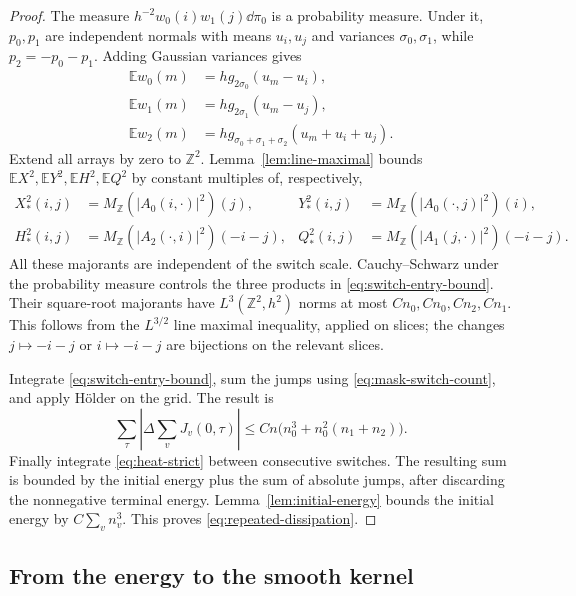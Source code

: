 \begin{proof}
The measure $h^{-2}w_0(i)w_1(j)\dd\pi_0$ is a probability measure.
Under it, $p_0,p_1$ are independent normals with means $u_i,u_j$
and variances $\sigma_0,\sigma_1$, while $p_2=-p_0-p_1$.
Adding Gaussian variances gives
\begin{align*}
 \mathbb E w_0(m)&=h g_{2\sigma_0}(u_m-u_i),\\
 \mathbb E w_1(m)&=h g_{2\sigma_1}(u_m-u_j),\\
 \mathbb E w_2(m)&=h g_{\sigma_0+\sigma_1+\sigma_2}(u_m+u_i+u_j).
\end{align*}
Extend all arrays by zero to $\mathbb Z^2$. Lemma~\ref{lem:line-maximal}
bounds $\mathbb E X^2,\mathbb E Y^2,\mathbb E H^2,\mathbb E Q^2$
by constant multiples of, respectively,
\begin{align*}
 X_*^2(i,j)&=M_{\mathbb Z}(|A_0(i,\cdot)|^2)(j),&
 Y_*^2(i,j)&=M_{\mathbb Z}(|A_0(\cdot,j)|^2)(i),\\
 H_*^2(i,j)&=M_{\mathbb Z}(|A_2(\cdot,i)|^2)(-i-j),&
 Q_*^2(i,j)&=M_{\mathbb Z}(|A_1(j,\cdot)|^2)(-i-j).
\end{align*}
All these majorants are independent of the switch scale.
Cauchy--Schwarz under the probability measure controls the three
products in \eqref{eq:switch-entry-bound}. Their square-root majorants
have $L^3(\mathbb Z^2,h^2)$ norms at most
$Cn_0,Cn_0,Cn_2,Cn_1$. This follows from the $L^{3/2}$ line maximal
inequality, applied on slices; the changes $j\mapsto-i-j$ or
$i\mapsto-i-j$ are bijections on the relevant slices.

Integrate \eqref{eq:switch-entry-bound}, sum the jumps using
\eqref{eq:mask-switch-count}, and apply H\"older on the grid. The result is
\[
 \sum_\tau\left|\Delta\sum_vJ_v(0,\tau)\right|
 \le Cn\bigl(n_0^3+n_0^2(n_1+n_2)\bigr).
\]
Finally integrate \eqref{eq:heat-strict} between consecutive switches.
The resulting sum is bounded by the initial energy plus the sum of
absolute jumps, after discarding the nonnegative terminal energy.
Lemma~\ref{lem:initial-energy} bounds the initial energy by
$C\sum_vn_v^3$. This proves \eqref{eq:repeated-dissipation}.
\end{proof}

\subsection{From the energy to the smooth kernel}

